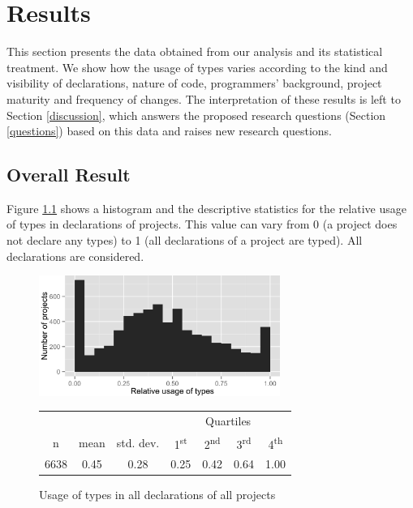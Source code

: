 \documentclass[msc]{ppgccufmg}
\newcommand{\ts}{\textsuperscript}
\begin{document}
%
%
\chapter{Results\label{results}}
This section presents the data obtained from our analysis and its statistical treatment.
We show how the usage of types varies according to the kind and visibility of declarations, nature of code, programmers' background, project maturity and frequency of changes.
The interpretation of these results is left to Section \ref{discussion}, which answers the proposed research questions (Section \ref{questions}) based on this data and raises new research questions.

\section{Overall Result\label{sec:results-overall}}

Figure \ref{fig:all_histogram_all} shows a histogram and the descriptive statistics for the relative usage of types in declarations of projects.
This value can vary from 0 (a project does not declare any types) to 1 (all declarations of a project are typed). 
All declarations are considered.

\begin{figure}[h]
\centering 
\includegraphics[width=0.7\textwidth]{../aosd_2014/analysis/result/all/histograms/5_all_types.png} 

\vspace{0.3cm}

\begin{tabular}{|c|c|c|cccc|}
\hline
{}		&  {}		&  {}			&  \multicolumn{4}{c|}{Quartiles}				\\
n		& mean	& std. dev.	& 1\ts{st}	& 2\ts{nd}	& 3\ts{rd}	& 4\ts{th}		\\
\hline
\hline
6638 	& 0.45	& 0.28		& 0.25	& 0.42		& 0.64	& 1.00		\\
\hline
\end{tabular}


\caption{Usage of types in all declarations of all projects}
\label{fig:all_histogram_all} 
\end{figure}
\end{document}

